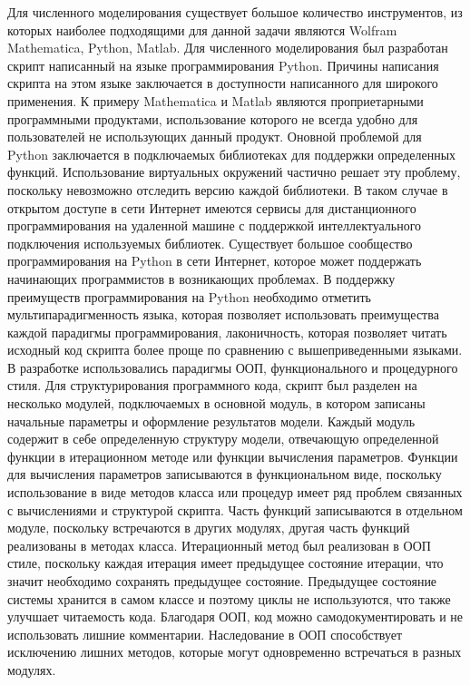 Для численного моделирования существует большое количество инструментов, из которых наиболее подходящими
для данной задачи являются Wolfram Mathematica, Python, Matlab.
Для численного моделирования был разработан скрипт написанный на языке программирования Python.
Причины написания скрипта на этом языке заключается в доступности написанного для широкого применения.
К примеру Mathematica и Matlab являются проприетарными программными продуктами, использование которого
не всегда удобно для пользователей не использующих данный продукт.
Оновной проблемой для Python заключается в подключаемых библиотеках для поддержки определенных функций.
Использование виртуальных окружений частично решает эту проблему, поскольку невозможно отследить версию
каждой библиотеки.
В таком случае в открытом доступе в сети Интернет имеются сервисы для дистанционного программирования на
удаленной машине с поддержкой интеллектуального подключения используемых библиотек.
Существует большое сообщество программирования на Python в сети Интернет, которое может поддержать
начинающих программистов в возникающих проблемах.
В поддержку преимуществ программирования на Python необходимо отметить мультипарадигменность языка,
которая позволяет использовать преимущества каждой парадигмы программирования, лаконичность, которая
позволяет читать исходный код скрипта более проще по сравнению с вышеприведенными языками.
В разработке использовались парадигмы ООП, функционального и процедурного стиля.
Для структурирования программного кода, скрипт был разделен на несколько модулей, подключаемых в основной
модуль, в котором записаны начальные параметры и оформление результатов модели.
Каждый модуль содержит в себе определенную структуру модели, отвечающую определенной функции в итерационном
методе или функции вычисления параметров.
Функции для вычисления параметров записываются в функциональном виде, поскольку использование в виде
методов класса или процедур имеет ряд проблем связанных с вычислениями и структурой скрипта.
Часть функций записываются в отдельном модуле, поскольку встречаются в других модулях, другая часть
функций реализованы в методах класса.
Итерационный метод был реализован в ООП стиле, поскольку каждая итерация имеет предыдущее состояние
итерации, что значит необходимо сохранять предыдущее состояние.
Предыдущее состояние системы хранится в самом классе и поэтому циклы не используются, что также улучшает
читаемость кода.
Благодаря ООП, код можно самодокументировать и не использовать лишние комментарии.
Наследование в ООП способствует исключению лишних методов, которые могут одновременно встречаться в разных модулях.
